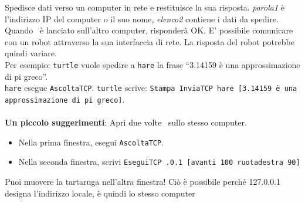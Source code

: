 Spedisce dati verso un computer in rete e restituisce la sua risposta. \textit{parola1} è l'indirizzo IP del computer o il suo nome, \textit{elenco2} contiene i dati da spedire. Quando \xlogo\ è lanciato sull'altro computer, risponderà OK. E' possibile comunicare con un robot attraverso la sua interfaccia di rete. La risposta del robot potrebbe quindi variare. \\
Per esempio: \texttt{turtle} vuole spedire a \texttt{hare} la frase ``3.14159 è una approssimazione di pi greco''.\\
\texttt{hare} esegue \texttt{AscoltaTCP}. \texttt{turtle} scrive: \texttt{Stampa~InviaTCP~\textquotedbl hare~[3.14159 è una approssimazione di pi greco]}.\\ \\
\textbf{Un piccolo suggerimenti}: Apri due volte \xlogo\ sullo stesso computer.
\begin{itemize}
	\item Nella prima finestra, esegui \texttt{AscoltaTCP}.
	\item Nella seconda finestra, scrivi \texttt{EseguiTCP .0.1 [avanti 100 ruotadestra 90]}
\end{itemize}
Puoi muovere la tartaruga nell'altra finestra! Ciò è possibile perché 127.0.0.1 designa l'indirizzo locale, è quindi lo stesso computer \textellipsis




